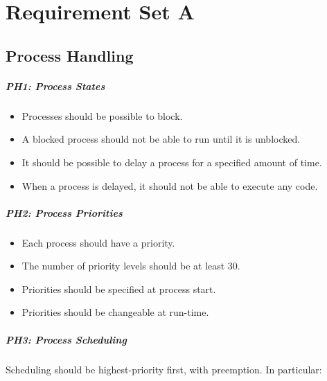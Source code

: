 \chapter{Requirement Set A}
\label{ch:setA}

\section{Process Handling}
\label{se:process_handling}

\paragraph{PH1: Process States}
\label{pg:ph1}

\begin{itemize}
  \item Processes should be possible to block.
  \item  A blocked process should not be able to run until it is unblocked.
  \item  It should be possible to delay a process for a specified amount of time.
  \item  When a process is delayed, it should not be able to execute any code.
\end{itemize}

\paragraph{PH2: Process Priorities}
\label{pg:ph2}

\begin{itemize}
  \item Each process should have a priority.
  \item  The number of priority levels should be at least 30.
  \item  Priorities should be specified at process start.
  \item  Priorities should be changeable at run-time.
\end{itemize}

\paragraph{PH3: Process Scheduling}
\label{pg:ph3}

Scheduling should be highest-priority first, with preemption. In particular:

